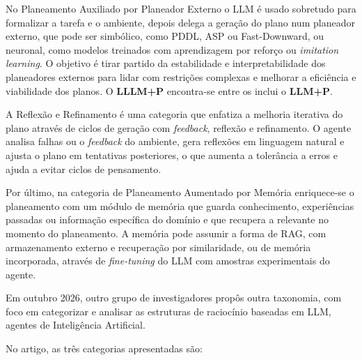 No Planeamento Auxiliado por Planeador Externo o LLM é usado sobretudo para formalizar a tarefa e o ambiente, depois delega a geração do plano num planeador externo, que pode ser simbólico, como PDDL, ASP ou Fast-Downward, ou neuronal, como modelos treinados com aprendizagem por reforço ou \textit{imitation learning}. O objetivo é tirar partido da estabilidade e interpretabilidade dos planeadores externos para lidar com restrições complexas e melhorar a eficiência e viabilidade dos planos. O \textbf{LLLM+P} encontra-se entre os inclui o \textbf{LLM+P}.

A Reflexão e Refinamento é uma categoria que enfatiza a melhoria iterativa do plano através de ciclos de geração com \textit{feedback}, reflexão e refinamento. O agente analisa falhas ou o \textit{feedback} do ambiente, gera reflexões em linguagem natural e ajusta o plano em tentativas posteriores, o que aumenta a tolerância a erros e ajuda a evitar ciclos de pensamento.

Por último, na categoria de Planeamento Aumentado por Memória enriquece-se o planeamento com um módulo de memória que guarda conhecimento, experiências passadas ou informação específica do domínio e que recupera a relevante no momento do planeamento. A memória pode assumir a forma de RAG, com armazenamento externo e recuperação por similaridade, ou de memória incorporada, através de \textit{fine-tuning} do LLM com amostras experimentais do agente.

Em outubro 2026, outro grupo de investigadores propôs outra taxonomia, com foco em categorizar e analisar as estruturas de raciocínio baseadas em LLM, agentes de Inteligência Artificial.~\cite{zhao2025llm}

No artigo, as três categorias apresentadas são:

